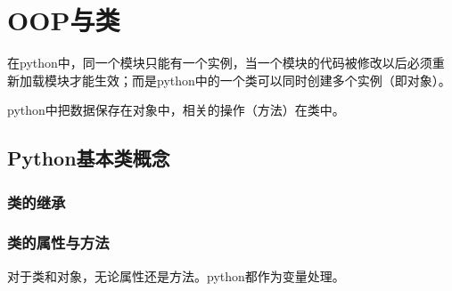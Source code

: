 \chapter{OOP与类}
	
	在python中，同一个模块只能有一个实例，当一个模块的代码被修改以后必须重新加载模块才能生效；而是python中的一个类可以同时创建多个实例（即对象）。

	python中把数据保存在对象中，相关的操作（方法）在类中。

	\section{Python基本类概念}

		\subsection{类的继承}
 			

		\subsection{类的属性与方法}
			对于类和对象，无论属性还是方法。python都作为变量处理。
			
